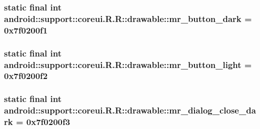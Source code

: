 \hypertarget{classandroid_1_1support_1_1coreui_1_1_r_1_1drawable_e258b68df21731937305d4a307c7adf9}{
\subsubsection[{mr\_\-button\_\-dark}]{\setlength{\rightskip}{0pt plus 5cm}static final int android::support::coreui.R.R::drawable::mr\_\-button\_\-dark = 0x7f0200f1}}
\label{classandroid_1_1support_1_1coreui_1_1_r_1_1drawable_e258b68df21731937305d4a307c7adf9}


\hypertarget{classandroid_1_1support_1_1coreui_1_1_r_1_1drawable_7386f58e35de13870a334f7e92d7820c}{
\subsubsection[{mr\_\-button\_\-light}]{\setlength{\rightskip}{0pt plus 5cm}static final int android::support::coreui.R.R::drawable::mr\_\-button\_\-light = 0x7f0200f2}}
\label{classandroid_1_1support_1_1coreui_1_1_r_1_1drawable_7386f58e35de13870a334f7e92d7820c}


\hypertarget{classandroid_1_1support_1_1coreui_1_1_r_1_1drawable_aa713438ddff0e37f044408b954efd48}{
\subsubsection[{mr\_\-dialog\_\-close\_\-dark}]{\setlength{\rightskip}{0pt plus 5cm}static final int android::support::coreui.R.R::drawable::mr\_\-dialog\_\-close\_\-dark = 0x7f0200f3}}
\label{classandroid_1_1support_1_1coreui_1_1_r_1_1drawable_aa713438ddff0e37f044408b954efd48}


